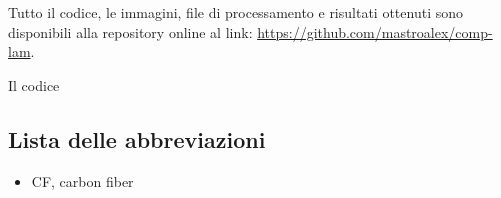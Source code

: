 \documentclass[a4paper,num-refs]{oup-contemporary}
\begin{document}
Tutto il codice, le immagini, file di processamento e risultati ottenuti sono disponibili alla repository online al link: \url{https://github.com/mastroalex/comp-lam}. 

Il codice 


\subsection{Lista delle abbreviazioni}

\begin{itemize}
	\item CF, carbon fiber
\end{itemize}
 



\newpage

\end{document}
